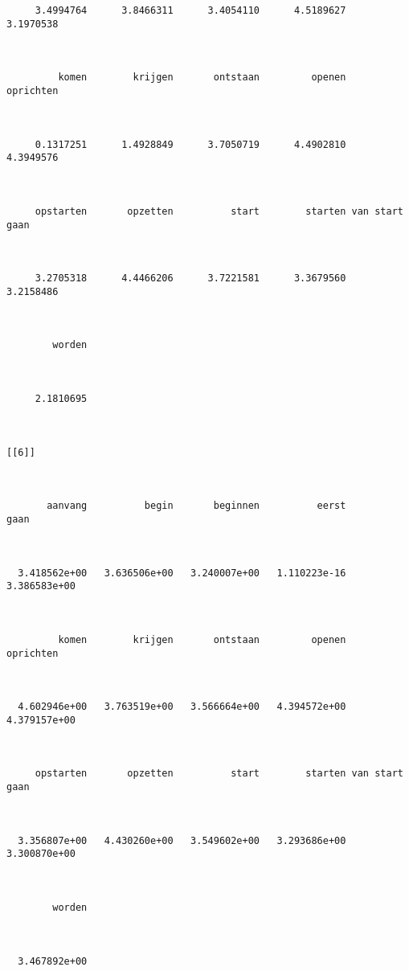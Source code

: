 \begin{lstlisting}
     3.4994764      3.8466311      3.4054110      4.5189627      3.1970538 



         komen        krijgen       ontstaan         openen      oprichten 



     0.1317251      1.4928849      3.7050719      4.4902810      4.3949576 



     opstarten       opzetten          start        starten van start gaan 



     3.2705318      4.4466206      3.7221581      3.3679560      3.2158486 



        worden 



     2.1810695 



[[6]]



       aanvang          begin       beginnen          eerst           gaan 



  3.418562e+00   3.636506e+00   3.240007e+00   1.110223e-16   3.386583e+00 



         komen        krijgen       ontstaan         openen      oprichten 



  4.602946e+00   3.763519e+00   3.566664e+00   4.394572e+00   4.379157e+00 



     opstarten       opzetten          start        starten van start gaan 



  3.356807e+00   4.430260e+00   3.549602e+00   3.293686e+00   3.300870e+00 



        worden 



  3.467892e+00 
\end{lstlisting}


